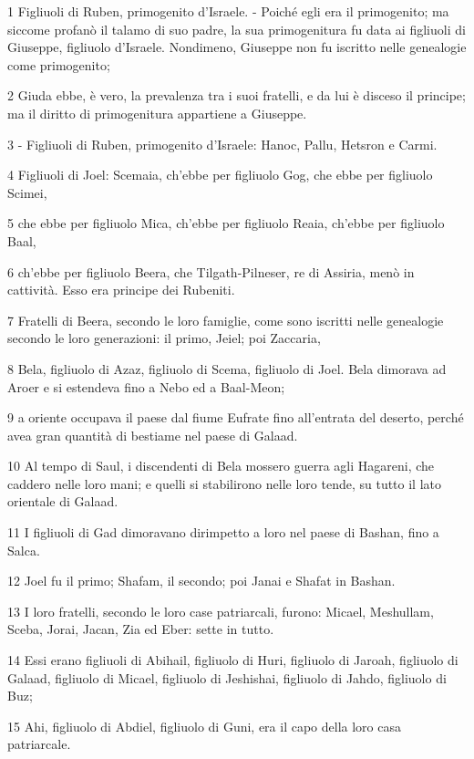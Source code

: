 \par 1 Figliuoli di Ruben, primogenito d'Israele. - Poiché egli era il primogenito; ma siccome profanò il talamo di suo padre, la sua primogenitura fu data ai figliuoli di Giuseppe, figliuolo d'Israele. Nondimeno, Giuseppe non fu iscritto nelle genealogie come primogenito;
\par 2 Giuda ebbe, è vero, la prevalenza tra i suoi fratelli, e da lui è disceso il principe; ma il diritto di primogenitura appartiene a Giuseppe.
\par 3 - Figliuoli di Ruben, primogenito d'Israele: Hanoc, Pallu, Hetsron e Carmi.
\par 4 Figliuoli di Joel: Scemaia, ch'ebbe per figliuolo Gog, che ebbe per figliuolo Scimei,
\par 5 che ebbe per figliuolo Mica, ch'ebbe per figliuolo Reaia, ch'ebbe per figliuolo Baal,
\par 6 ch'ebbe per figliuolo Beera, che Tilgath-Pilneser, re di Assiria, menò in cattività. Esso era principe dei Rubeniti.
\par 7 Fratelli di Beera, secondo le loro famiglie, come sono iscritti nelle genealogie secondo le loro generazioni: il primo, Jeiel; poi Zaccaria,
\par 8 Bela, figliuolo di Azaz, figliuolo di Scema, figliuolo di Joel. Bela dimorava ad Aroer e si estendeva fino a Nebo ed a Baal-Meon;
\par 9 a oriente occupava il paese dal fiume Eufrate fino all'entrata del deserto, perché avea gran quantità di bestiame nel paese di Galaad.
\par 10 Al tempo di Saul, i discendenti di Bela mossero guerra agli Hagareni, che caddero nelle loro mani; e quelli si stabilirono nelle loro tende, su tutto il lato orientale di Galaad.
\par 11 I figliuoli di Gad dimoravano dirimpetto a loro nel paese di Bashan, fino a Salca.
\par 12 Joel fu il primo; Shafam, il secondo; poi Janai e Shafat in Bashan.
\par 13 I loro fratelli, secondo le loro case patriarcali, furono: Micael, Meshullam, Sceba, Jorai, Jacan, Zia ed Eber: sette in tutto.
\par 14 Essi erano figliuoli di Abihail, figliuolo di Huri, figliuolo di Jaroah, figliuolo di Galaad, figliuolo di Micael, figliuolo di Jeshishai, figliuolo di Jahdo, figliuolo di Buz;
\par 15 Ahi, figliuolo di Abdiel, figliuolo di Guni, era il capo della loro casa patriarcale.
